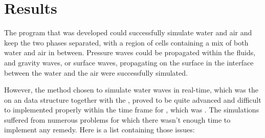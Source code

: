 \chapter{Results}


The program that was developed could successfully simulate water and air and keep the two phases separated, with a region of cells containing a mix of both water and air in between. Pressure waves could be propagated within the fluids, and gravity waves, or surface waves, propagating on the surface in the interface between the water and the air were successfully simulated.


However, the method chosen to simulate water waves in real-time, which was the \FVM on an \octree data structure together with the \VOF, proved to be quite advanced and difficult to implemented properly within the time frame for \thismasterthesiswork, which was \masterthesisworktime. The simulations suffered from numerous problems for which there wasn't enough time to implement any remedy. Here is a list containing those issues:


